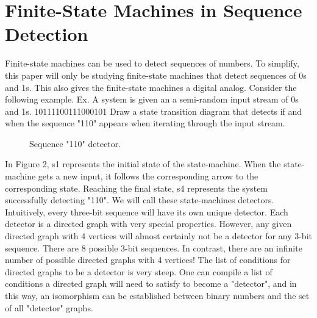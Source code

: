 \documentclass[12pt]{article}
\begin{document}
\newpage
\section[20pt]{Finite-State Machines in Sequence Detection}
Finite-state machines can be used to detect sequences of numbers. To simplify, this paper will only be studying finite-state machines that detect sequences of 0s and 1s. This also gives the finite-state machines a digital analog. Consider the following example.
\newline
\newline
Ex. A system is given an a semi-random input stream of 0s and 1s. 10111100111000101 Draw a state transition diagram that detects if and when the sequence "110" appears when iterating through the input stream.
\begin{figure}[ht]
	\centering
	\caption{Sequence "110" detector.}
\end{figure}
\newline
In Figure 2, s1 represents the initial state of the state-machine. When the state-machine gets a new input, it follows the corresponding arrow to the corresponding state. Reaching the final state, s4 represents the system successfully detecting "110". We will call these state-machines detectors.
\newline
\newline
Intuitively, every three-bit sequence will have its own unique detector. Each detector is a directed graph with very special properties. However, any given directed graph with 4 vertices will almost certainly not be a detector for any 3-bit sequence. There are 8 possible 3-bit sequences. In contrast, there are an infinite number of possible directed graphs with 4 vertices! The list of conditions for directed graphs to be a detector is very steep. One can compile a list of conditions a directed graph will need to satisfy to become a "detector", and in this way, an isomorphism can be established between binary numbers and the set of all "detector" graphs.
\newpage
\end{document}
